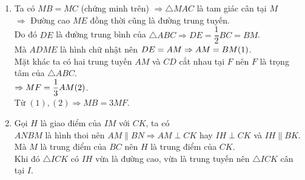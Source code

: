 \begin{bt}
{\begin{enumerate}
Do đó tứ giác $ANBM$ có hai đường chéo cắt nhau tại trung điểm $D$ của mỗi đường.\\
Nên $ANBM$ là hình bình hành.\\
Kết hợp với $MA=MB$ (chứng minh trên) ta suy ra được $ANBM$ là hình thoi.
\item Ta có $MB=MC$ (chứng minh trên) $\Rightarrow \triangle MAC$ là tam giác cân tại $M$\\$\Rightarrow $ Đường cao $ME$ đồng thời cũng là đường trung tuyến.\\
Do đó $DE$ là đường trung bình của $\triangle ABC\Rightarrow DE=\dfrac{1}{2}BC=BM$.\\
Mà $ADME$ là hình chữ nhật nên $DE=AM\Rightarrow AM=BM\hfill (1)$.\\
Mặt khác ta có hai trung tuyến $AM$ và $CD$ cắt nhau tại $F$ nên $F$ là trọng tâm của $\triangle ABC$.\\
$\Rightarrow MF=\dfrac{1}{3}AM\hfill (2)$.\\
Từ $(1),(2)\Rightarrow MB=3MF$.
\item Gọi $H$ là giao điểm của $IM$ với $CK$, ta có\\
$ANBM$ là hình thoi nên $AM\parallel BN\Rightarrow AM\perp CK$ hay $IH\perp CK$ và $IH\parallel BK$.\\
Mà $M$ là trung điểm của $BC$ nên $H$ là trung điểm của $CK$.\\
Khi đó $\triangle ICK$ có $IH$ vừa là đường cao, vừa là trung tuyến nên $\triangle ICK$ cân tại $I$.
\end{enumerate}
}
\end{bt}
